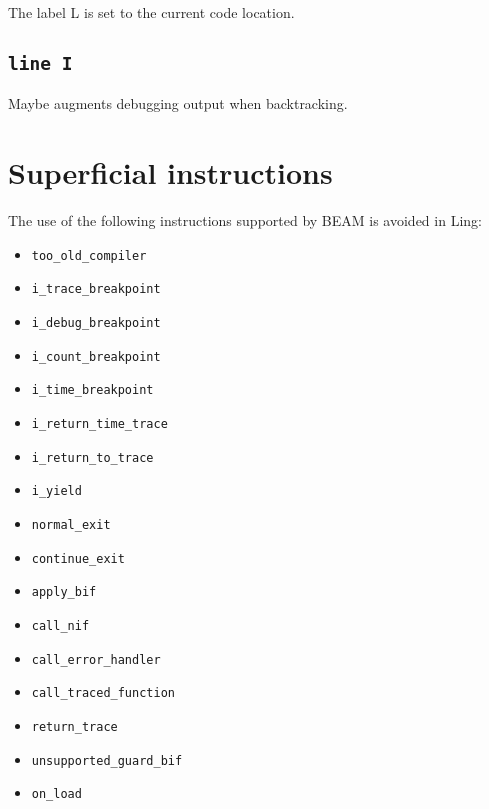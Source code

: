 \documentclass{article}
\newcommand{\iop}[1]{\texttt{#1}}
\begin{document}
The label L is set to the current code location.

\subsection*{\iop{line I}}

Maybe augments debugging output when backtracking.

\section*{Superficial instructions}

The use of the following instructions supported by BEAM is avoided in Ling$:$

\begin{multicols}{2}
\begin{itemize}
\item \iop{too\_old\_compiler}
\item \iop{i\_trace\_breakpoint}
\item \iop{i\_debug\_breakpoint}
\item \iop{i\_count\_breakpoint}
\item \iop{i\_time\_breakpoint}
\item \iop{i\_return\_time\_trace}
\item \iop{i\_return\_to\_trace}
\item \iop{i\_yield}
\item \iop{normal\_exit}
\item \iop{continue\_exit}
\item \iop{apply\_bif}
\item \iop{call\_nif}
\item \iop{call\_error\_handler}
\item \iop{call\_traced\_function}
\item \iop{return\_trace}
\item \iop{unsupported\_guard\_bif}
\item \iop{on\_load}
\end{itemize}
\end{multicols}
\end{document}
